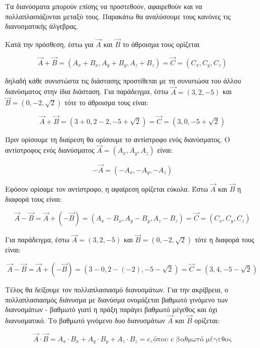 Τα διανύσματα μπορούν επίσης να προστεθούν, αφαιρεθούν και να πολλαπλασιάζονται μεταξύ τους. Παρακάτω θα αναλύσουμε τους κανόνες τις
διανυσματικής άλγεβρας.

Κατά την πρόσθεση, έστω για $\vec{A}$ και $\vec{B}$ το άθροισμα τους ορίζεται

\begin{equation}
    \vec{A} + \vec{B} = (A_x + B_x, A_y + B_y, A_z + B_z) = \vec{C} = (C_x, C_y, C_z)
\end{equation}

δηλαδή κάθε συνιστώστα τις διάστασης προστίθεται με τη συνιστώσα του άλλου διανύσματος στην ίδια διάσταση. Για παράδειγμα, έστω
$\vec{A} = (3, 2, -5)$ και $\vec{B} = (0, -2, \sqrt{2})$ τότε το άθροισμα τους είναι:

\begin{equation}
    \vec{A} + \vec{B} = (3+0,2-2,-5+\sqrt{2}) = \vec{C} = (3,0,-5+\sqrt{2})
\end{equation}

Πριν ορίσουμε τη διαίρεση θα ορίσουμε το αντίστροφο ενός διανύσματος. Ο αντίστροφος ενός διανύσματος $\vec{A} = (A_x, A_y, A_z)$
είναι:

\begin{equation}
    -\vec{A} = (-A_x, -A_y, -A_z)
\end{equation}

Εφόσον ορίσαμε τον αντίστροφο, η αφαίρεση ορίζεται εύκολα. Έστω $\vec{A}$ και $\vec{B}$ η διαφορά τους είναι:

\begin{equation}
    \vec{A} - \vec{B} = \vec{A} + (-\vec{B}) = (A_x - B_x, A_y - B_y, A_z - B_z) = \vec{C} = (C_x, C_y, C_z)
\end{equation}

Για παράδειγμα, έστω $\vec{A} = (3, 2, -5)$ και $\vec{B} = (0, -2, \sqrt{2})$ τότε η διαφορά τους είναι:

\begin{equation}
    \vec{A} - \vec{B} = \vec{A} + (-\vec{B}) = (3-0,2-(-2),-5-\sqrt{2}) = \vec{C} = (3,4,-5-\sqrt{2})
\end{equation}

Τέλος θα δείξουμε τον πολλαπλασιασμό διανυσμάτων. Για την ακρίβρεια, ο πολλαπλασιασμός διάνυσμα με διανύσμα ονομάζεται
βαθμωτό γινόμενο των διανυσμάτων - βαθμωτό γιατί η πράξη παράγει βαθμωτό μέγεθος και όχι διανυσματικό. Το βαθμωτό
γινόμενο δυο διανυσμάτων $\vec{A}$ και $\vec{B}$ ορίζεται:

\begin{equation}
    \vec{A} \cdot \vec{B} = A_x \cdot B_x + A_y \cdot B_y + A_z \cdot B_z = c, \text{όπου } c \text{ βαθμωτό μέγεθος}
\end{equation}

